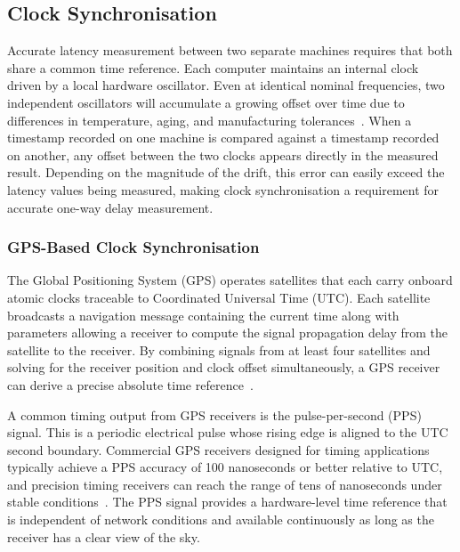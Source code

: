 \vspace{5mm}
\subsection{Clock Synchronisation}\label{subsec:clock-sync}
Accurate latency measurement between two separate machines requires that both share a common time reference. Each computer maintains an internal clock driven by a local hardware oscillator. Even at identical nominal frequencies, two independent oscillators will accumulate a growing offset over time due to differences in temperature, aging, and manufacturing tolerances~\cite{vannicola2012}. When a timestamp recorded on one machine is compared against a timestamp recorded on another, any offset between the two clocks appears directly in the measured result. Depending on the magnitude of the drift, this error can easily exceed the latency values being measured, making clock synchronisation a requirement for accurate one-way delay measurement.

\subsubsection{GPS-Based Clock Synchronisation}\label{subsubsec:gps-sync}
The Global Positioning System (GPS) operates satellites that each carry onboard atomic clocks traceable to Coordinated Universal Time (UTC). Each satellite broadcasts a navigation message containing the current time along with parameters allowing a receiver to compute the signal propagation delay from the satellite to the receiver. By combining signals from at least four satellites and solving for the receiver position and clock offset simultaneously, a GPS receiver can derive a precise absolute time reference~\cite{misra2011}.

A common timing output from GPS receivers is the pulse-per-second (PPS) signal. This is a periodic electrical pulse whose rising edge is aligned to the UTC second boundary. Commercial GPS receivers designed for timing applications typically achieve a PPS accuracy of 100 nanoseconds or better relative to UTC, and precision timing receivers can reach the range of tens of nanoseconds under stable conditions~\cite{vannicola2012, sesia2010}. The PPS signal provides a hardware-level time reference that is independent of network conditions and available continuously as long as the receiver has a clear view of the sky.


